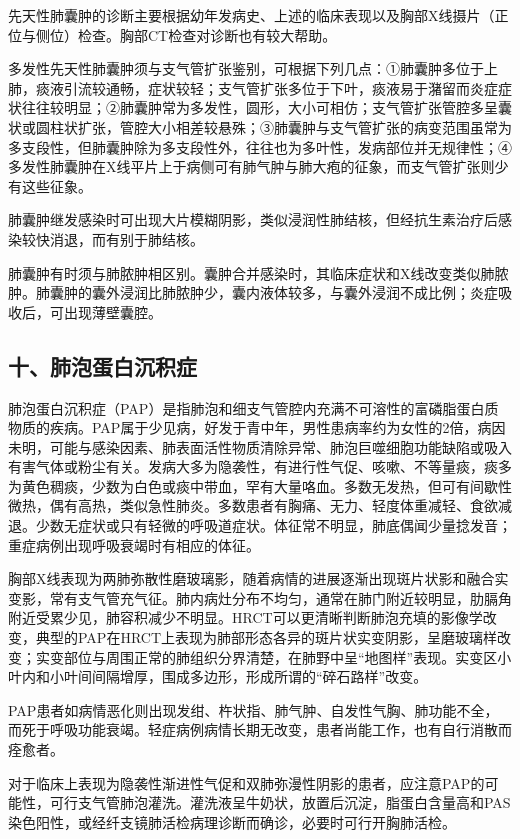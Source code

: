 先天性肺囊肿的诊断主要根据幼年发病史、上述的临床表现以及胸部X线摄片（正位与侧位）检查。胸部CT检查对诊断也有较大帮助。

多发性先天性肺囊肿须与支气管扩张鉴别，可根据下列几点：①肺囊肿多位于上肺，痰液引流较通畅，症状较轻；支气管扩张多位于下叶，痰液易于潴留而炎症症状往往较明显；②肺囊肿常为多发性，圆形，大小可相仿；支气管扩张管腔多呈囊状或圆柱状扩张，管腔大小相差较悬殊；③肺囊肿与支气管扩张的病变范围虽常为多支段性，但肺囊肿除为多支段性外，往往也为多叶性，发病部位并无规律性；④多发性肺囊肿在X线平片上于病侧可有肺气肿与肺大疱的征象，而支气管扩张则少有这些征象。

肺囊肿继发感染时可出现大片模糊阴影，类似浸润性肺结核，但经抗生素治疗后感染较快消退，而有别于肺结核。

肺囊肿有时须与肺脓肿相区别。囊肿合并感染时，其临床症状和X线改变类似肺脓肿。肺囊肿的囊外浸润比肺脓肿少，囊内液体较多，与囊外浸润不成比例；炎症吸收后，可出现薄壁囊腔。

\subsection{十、肺泡蛋白沉积症}

肺泡蛋白沉积症（PAP）是指肺泡和细支气管腔内充满不可溶性的富磷脂蛋白质物质的疾病。PAP属于少见病，好发于青中年，男性患病率约为女性的2倍，病因未明，可能与感染因素、肺表面活性物质清除异常、肺泡巨噬细胞功能缺陷或吸入有害气体或粉尘有关。发病大多为隐袭性，有进行性气促、咳嗽、不等量痰，痰多为黄色稠痰，少数为白色或痰中带血，罕有大量咯血。多数无发热，但可有间歇性微热，偶有高热，类似急性肺炎。多数患者有胸痛、无力、轻度体重减轻、食欲减退。少数无症状或只有轻微的呼吸道症状。体征常不明显，肺底偶闻少量捻发音；重症病例出现呼吸衰竭时有相应的体征。

胸部X线表现为两肺弥散性磨玻璃影，随着病情的进展逐渐出现斑片状影和融合实变影，常有支气管充气征。肺内病灶分布不均匀，通常在肺门附近较明显，肋膈角附近受累少见，肺容积减少不明显。HRCT可以更清晰判断肺泡充填的影像学改变，典型的PAP在HRCT上表现为肺部形态各异的斑片状实变阴影，呈磨玻璃样改变；实变部位与周围正常的肺组织分界清楚，在肺野中呈“地图样”表现。实变区小叶内和小叶间间隔增厚，围成多边形，形成所谓的“碎石路样”改变。

PAP患者如病情恶化则出现发绀、杵状指、肺气肿、自发性气胸、肺功能不全，而死于呼吸功能衰竭。轻症病例病情长期无改变，患者尚能工作，也有自行消散而痊愈者。

对于临床上表现为隐袭性渐进性气促和双肺弥漫性阴影的患者，应注意PAP的可能性，可行支气管肺泡灌洗。灌洗液呈牛奶状，放置后沉淀，脂蛋白含量高和PAS染色阳性，或经纤支镜肺活检病理诊断而确诊，必要时可行开胸肺活检。

